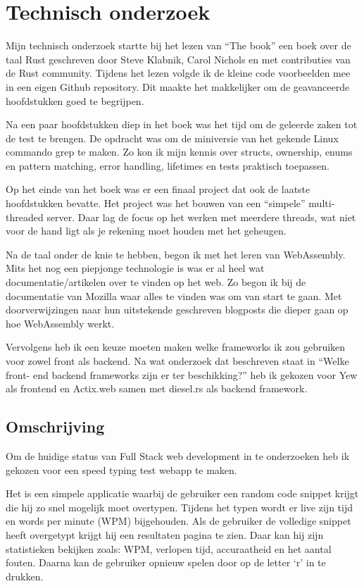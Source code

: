 \chapter{Technisch onderzoek}

Mijn technisch onderzoek startte bij het lezen van “The book” een boek over de taal Rust geschreven
door Steve Klabnik, Carol Nichols en met contributies van de Rust community. Tijdens het lezen
volgde ik de kleine code voorbeelden mee in een eigen Github repository. Dit maakte het makkelijker
om de geavanceerde hoofdstukken goed te begrijpen. 

Na een paar hoofdstukken diep in het boek was het tijd om de geleerde zaken tot de test te brengen.
De opdracht was om de miniversie van het gekende Linux commando grep te maken. Zo kon ik mijn kennis
over structs, ownership, enums en pattern matching, error handling, lifetimes en tests praktisch
toepassen.  

Op het einde van het boek was er een finaal project dat ook de laatste hoofdstukken bevatte. Het
project was het bouwen van een “simpele” multi-threaded server. Daar lag de focus op het werken met
meerdere threads, wat niet voor de hand ligt als je rekening moet houden met het geheugen. 

Na de taal onder de knie te hebben, begon ik met het leren van WebAssembly. Mits het nog een
piepjonge technologie is was er al heel wat documentatie/artikelen over te vinden op het web. Zo
begon ik bij de documentatie van Mozilla waar alles te vinden was om van start te gaan. Met
doorverwijzingen naar hun uitstekende geschreven blogposts die dieper gaan op hoe WebAssembly werkt. 

Vervolgens heb ik een keuze moeten maken welke frameworks ik zou gebruiken voor zowel front als
backend. Na wat onderzoek dat beschreven staat in “Welke front- end backend frameworks zijn er ter
beschikking?” heb ik gekozen voor Yew als frontend en Actix.web samen met diesel.rs als backend
framework.

\clearpage

\section{Omschrijving}

Om de huidige status van Full Stack web development in te onderzoeken heb ik gekozen voor een speed
typing test webapp te maken.

Het is een simpele applicatie waarbij de gebruiker een random code snippet krijgt die hij zo snel
mogelijk moet overtypen. Tijdens het typen wordt er live zijn tijd en words per minute (WPM)
bijgehouden. Als de gebruiker de volledige snippet heeft overgetypt krijgt hij een resultaten pagina
te zien. Daar kan hij zijn statistieken bekijken zoals: WPM, verlopen tijd, accuraatheid en het
aantal fouten. Daarna kan de gebruiker opnieuw spelen door op de letter ‘r’ in te drukken. 

